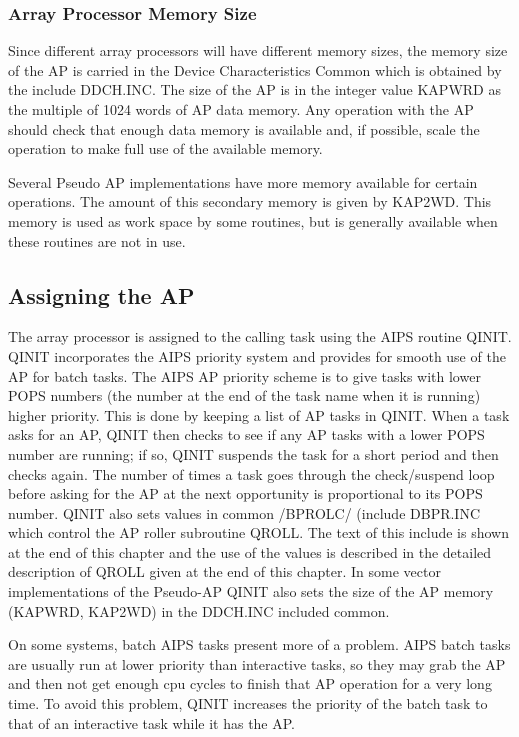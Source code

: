 \subsubsection{Array Processor Memory Size }
Since different array processors will have different memory sizes, the
memory size of the AP is carried in the Device Characteristics Common
which is obtained by the include DDCH.INC.  The size of
the AP is in the integer value KAPWRD as the multiple of 1024 words of AP
data memory.  Any operation with the AP should check that enough data
memory is available and, if possible, scale the operation to make full
use of the available memory.

Several Pseudo AP implementations have more memory available for
certain operations.  The amount of this secondary memory is given by
KAP2WD.  This memory is used as work space by some routines, but is
generally available when these routines are not in use.

\subsection{Assigning the AP }
The array processor is assigned to the calling task using the AIPS
routine QINIT.  QINIT incorporates the AIPS priority
system and provides for smooth use of the AP for batch tasks.  The
AIPS AP priority scheme is to give tasks with lower POPS numbers (the
number at the end of the task name when it is running) higher
priority. This is done by keeping a list of AP tasks in QINIT.  When a
task asks for an AP, QINIT then checks to see if any AP tasks with a
lower POPS number are running; if so, QINIT suspends the task for a
short period and then checks again.  The number of times a task goes
through the check/suspend loop before asking for the AP at the next
opportunity is proportional to its POPS number. QINIT
also sets values in common /BPROLC/ (include DBPR.INC
which control the AP roller subroutine QROLL. The text of
this include is shown at the end of this chapter and the use of the
values is described in the detailed description of QROLL given at the
end of this chapter.  In some vector implementations of the Pseudo-AP
QINIT also sets the size of the AP memory (KAPWRD, KAP2WD) in the
DDCH.INC included common.

On some systems, batch AIPS tasks present more of a problem. AIPS
batch tasks are usually run at lower priority than interactive tasks,
so they may grab the AP and then not get enough cpu cycles to finish
that AP operation for a very long time.  To avoid this problem,
QINIT
increases the priority of the batch task to that of an interactive
task while it has the AP.

